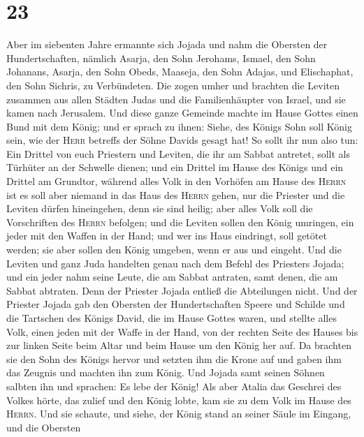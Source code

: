 \hypertarget{section-22}{%
\section{23}\label{section-22}}

 Aber im siebenten Jahre ermannte sich Jojada und nahm die
Obersten der Hundertschaften, nämlich Asarja, den Sohn Jerohams, Ismael,
den Sohn Johanans, Asarja, den Sohn Obeds, Maaseja, den Sohn Adajas, und
Elischaphat, den Sohn Sichris, zu Verbündeten.  Die zogen
umher und brachten die Leviten zusammen aus allen Städten Judas und die
Familienhäupter von Israel, und sie kamen nach Jerusalem. 
Und diese ganze Gemeinde machte im Hause Gottes einen Bund mit dem
König; und er sprach zu ihnen: Siehe, des Königs Sohn soll König sein,
wie der \textsc{Herr} betreffs der Söhne Davids gesagt hat!
 So sollt ihr nun also tun: Ein Drittel von euch Priestern
und Leviten, die ihr am Sabbat antretet, sollt als Türhüter an der
Schwelle dienen;  und ein Drittel im Hause des Königs und
ein Drittel am Grundtor, während alles Volk in den Vorhöfen am Hause des
\textsc{Herrn} ist  es soll aber niemand in das Haus des
\textsc{Herrn} gehen, nur die Priester und die Leviten dürfen
hineingehen, denn sie sind heilig; aber alles Volk soll die Vorschriften
des \textsc{Herrn} befolgen;  und die Leviten sollen den
König umringen, ein jeder mit den Waffen in der Hand; und wer ins Haus
eindringt, soll getötet werden; sie aber sollen den König umgeben, wenn
er aus und eingeht.  Und die Leviten und ganz Juda
handelten genau nach dem Befehl des Priesters Jojada; und ein jeder nahm
seine Leute, die am Sabbat antraten, samt denen, die am Sabbat abtraten.
Denn der Priester Jojada entließ die Abteilungen nicht. 
Und der Priester Jojada gab den Obersten der Hundertschaften Speere und
Schilde und die Tartschen des Königs David, die im Hause Gottes waren,
 und stellte alles Volk, einen jeden mit der Waffe in der
Hand, von der rechten Seite des Hauses bis zur linken Seite beim Altar
und beim Hause um den König her auf.  Da brachten sie den
Sohn des Königs hervor und setzten ihm die Krone auf und gaben ihm das
Zeugnis und machten ihn zum König. Und Jojada samt seinen Söhnen salbten
ihn und sprachen: Es lebe der König!  Als aber Atalia das
Geschrei des Volkes hörte, das zulief und den König lobte, kam sie zu
dem Volk im Hause des \textsc{Herrn}.  Und sie schaute,
und siehe, der König stand an seiner Säule im Eingang, und die Obersten

